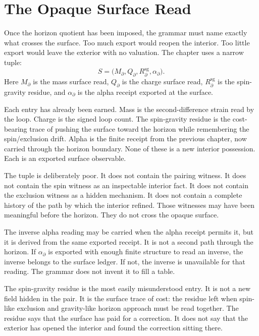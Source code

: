 \section{The Opaque Surface Read}

Once the horizon quotient has been imposed, the grammar must name exactly
what crosses the surface. Too much export would reopen the interior. Too
little export would leave the exterior with no valuation. The chapter uses a
narrow tuple:
\[
  S =
  \bigl(M_{\partial}, Q_{\partial},
        R^{\mathrm{sg}}_{\partial}, \alpha_{\partial}\bigr).
\]
Here \(M_{\partial}\) is the mass surface read, \(Q_{\partial}\) is the
charge surface read, \(R^{\mathrm{sg}}_{\partial}\) is the spin-gravity
residue, and \(\alpha_{\partial}\) is the alpha receipt exported at the
surface.

Each entry has already been earned. Mass is the second-difference strain
read by the loop. Charge is the signed loop count. The spin-gravity residue
is the cost-bearing trace of pushing the surface toward the horizon while
remembering the spin/exclusion drift. Alpha is the finite receipt from the
previous chapter, now carried through the horizon boundary. None of these is
a new interior possession. Each is an exported surface observable.

The tuple is deliberately poor. It does not contain the pairing witness. It
does not contain the spin witness as an inspectable interior fact. It does
not contain the exclusion witness as a hidden mechanism. It does not contain
a complete history of the path by which the interior refined. Those
witnesses may have been meaningful before the horizon. They do not cross
the opaque surface.

The inverse alpha reading may be carried when the alpha receipt permits it,
but it is derived from the same exported receipt. It is not a second path
through the horizon. If \(\alpha_{\partial}\) is exported with enough
finite structure to read an inverse, the inverse belongs to the surface
ledger. If not, the inverse is unavailable for that reading. The grammar
does not invent it to fill a table.

The spin-gravity residue is the most easily misunderstood entry. It is not a
new field hidden in the pair. It is the surface trace of cost: the residue
left when spin-like exclusion and gravity-like horizon approach must be read
together. The residue says that the surface has paid for a correction. It
does not say that the exterior has opened the interior and found the
correction sitting there.

